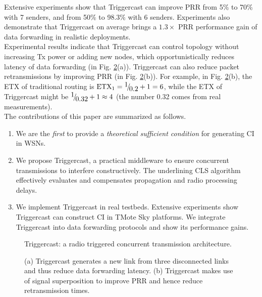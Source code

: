 \documentclass[conference]{IEEEtran}
\begin{document}
Extensive experiments show that Triggercast can improve PRR from 5\% to 70\% with 7 senders, and from 50\% to 98.3\% with 6 senders.
Experiments also demonstrate that Triggercast on average brings a $1.3\times$ PRR performance gain of data forwarding in realistic deployments.\\
\indent Experimental results indicate that Triggercast can control topology without increasing Tx power or adding new nodes, which opportunistically reduces latency of data forwarding (in Fig. \ref{Fig_OpportunisticRouting}(a)).
Triggercast can also reduce packet retransmissions by improving PRR (in Fig. \ref{Fig_OpportunisticRouting}(b)).
For example, in Fig. \ref{Fig_OpportunisticRouting}(b), the ETX of traditional routing is $\text{ETX}_1={\raise0.7ex\hbox{$1$} \!\mathord{\left/
 {\vphantom {1 {0.2}}}\right.\kern-\nulldelimiterspace}
\!\lower0.7ex\hbox{${0.2}$}} + 1 = 6$,
while the ETX of Triggercast might be ${\raise0.7ex\hbox{$1$} \!\mathord{\left/
 {\vphantom {1 {0.3}}}\right.\kern-\nulldelimiterspace}
\!\lower0.7ex\hbox{${0.32}$}} + 1 \approx 4$ (the number 0.32 comes from real measurements).\\
\indent The contributions of this paper are summarized as follows.
\begin{enumerate}
\setlength{\itemsep}{-0.245ex}
\item
We are the \emph{first} to provide a \emph{theoretical sufficient condition} for generating CI in WSNs.
\item
We propose Triggercast, a practical middleware to ensure concurrent transmissions to interfere constructively.
The underlining CLS algorithm effectively evaluates and compensates propagation and radio processing delays.
\item
We implement Triggercast in real testbeds. Extensive experiments show Triggercast can construct CI in TMote Sky platforms. We integrate Triggercast into data forwarding protocols and show its performance gains.
\end{enumerate}
\begin{figure}
\centering
\caption{Triggercast: a radio triggered concurrent transmission architecture.}
{\label{Fig_TriggerCastArchitecture}}
\end{figure}
\begin{figure}
\centering
\caption{(a) Triggercast generates a new link from three disconnected links and thus reduce data forwarding latency. (b) Triggercast makes use of signal superposition to improve PRR and hence reduce retransmission times.}
{\label{Fig_OpportunisticRouting}}
\end{figure}
\end{document}

